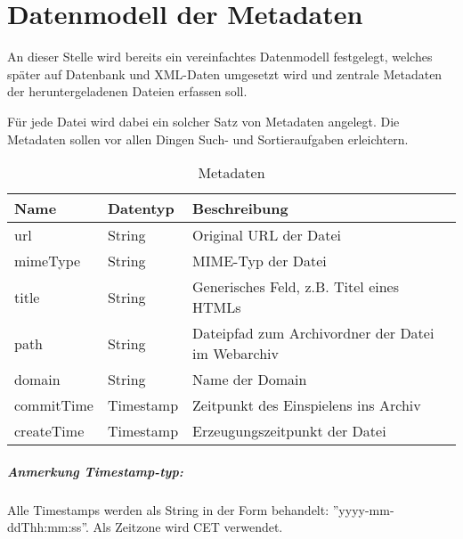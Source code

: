 \chapter{Datenmodell der Metadaten} \label{spec:model}
An dieser Stelle wird bereits ein vereinfachtes Datenmodell festgelegt, 
welches später auf Datenbank und XML-Daten umgesetzt wird und zentrale Metadaten 
der heruntergeladenen Dateien erfassen soll. 

Für jede Datei wird dabei ein solcher Satz von Metadaten angelegt.
Die Metadaten sollen vor allen Dingen Such- und Sortieraufgaben erleichtern. 

\begin{table}[h]
\centering
\begin{tabular}{|l|l|l|}	
	\hline
	Name 		& Datentyp 				& Beschreibung \\
	\hline
	url 		& String 				& Original URL der Datei\\
	\hline
	mimeType	& String 				& MIME-Typ der Datei\\
	\hline
	title 		& String 				& Generisches Feld, z.B. Titel eines HTMLs \\ 
	\hline
	path 		& String 				& Dateipfad zum Archivordner der Datei im Webarchiv \\
	\hline
	domain 		& String 				& Name der Domain \\
	\hline
	commitTime 	& Timestamp 			& Zeitpunkt des Einspielens ins Archiv \\
	\hline
	createTime 	& Timestamp 			& Erzeugungszeitpunkt der Datei \\
	\hline
\end{tabular}
\caption{Metadaten}
\end{table}

\paragraph{Anmerkung Timestamp-typ:}
Alle Timestamps werden als String in der Form behandelt:
''yyyy-mm-ddThh:mm:ss''. Als Zeitzone wird CET verwendet.

